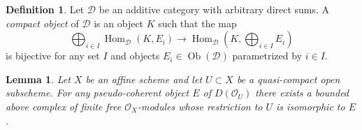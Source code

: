 \documentclass{amsart}
\theoremstyle{plain}
\newtheorem{lemma}[subsection]{Lemma}
\theoremstyle{definition}
\newtheorem{definition}[subsection]{Definition}
\theoremstyle{remark}
\numberwithin{equation}{subsection}
\def\Hom{\mathop{\mathrm{Hom}}\nolimits}
\def\Ob{\mathop{\mathrm{Ob}}\nolimits}
\begin{document}
\begin{definition}
\label{derived-definition-compact-object}
Let $\mathcal{D}$ be an additive category with arbitrary direct
sums. A {\it compact object} of $\mathcal{D}$ is an object $K$
such that the map
$$
\bigoplus\nolimits_{i \in I} \Hom_{\mathcal{D}}(K, E_i)
\longrightarrow
\Hom_{\mathcal{D}}(K, \bigoplus\nolimits_{i \in I} E_i)
$$
is bijective for any set $I$ and objects
$E_i \in \Ob(\mathcal{D})$ parametrized by $i \in I$.
\end{definition}

\begin{lemma}
\label{lemma-lift-pseudo-coherent}
Let $X$ be an affine scheme and let $U \subset X$ be a quasi-compact
open subscheme. For any pseudo-coherent object $E$ of $D(\mathcal{O}_U)$
there exists a bounded above complex of finite free $\mathcal{O}_X$-modules 
whose restriction to $U$ is isomorphic to $E$.
\end{lemma}
\end{document}
